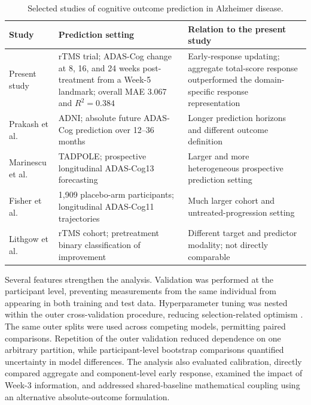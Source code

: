 \documentclass[11pt]{article}
\begin{document}
\begin{table}[H]
\centering
\caption{Selected studies of cognitive outcome prediction in Alzheimer disease.}
\label{tab:literature}
\small
\begin{tabular}{p{}p{}p{}}
\toprule
Study & Prediction setting & Relation to the present study \\
\midrule

Present study
& rTMS trial; ADAS-Cog change at 8, 16, and 24 weeks post-treatment from a Week-5 landmark; overall MAE 3.067 and $R^2=0.384$
& Early-response updating; aggregate total-score response outperformed the domain-specific response representation \\

\addlinespace

Prakash et al. \citep{prakash2021quantitative}
& ADNI; absolute future ADAS-Cog prediction over 12--36 months
& Longer prediction horizons and different outcome definition \\

\addlinespace

Marinescu et al. \citep{marinescu2021tadpole}
& TADPOLE; prospective longitudinal ADAS-Cog13 forecasting
& Larger and more heterogeneous prospective prediction setting \\

\addlinespace

Fisher et al. \citep{fisher2019forecasting}
& 1,909 placebo-arm participants; longitudinal ADAS-Cog11 trajectories
& Much larger cohort and untreated-progression setting \\

\addlinespace

Lithgow et al. \citep{lithgow2022baseline}
& rTMS cohort; pretreatment binary classification of improvement
& Different target and predictor modality; not directly comparable \\

\bottomrule
\end{tabular}
\end{table}

Several features strengthen the analysis. Validation was performed at the participant level, preventing measurements from the same individual from appearing in both training and test data. Hyperparameter tuning was nested within the outer cross-validation procedure, reducing selection-related optimism \citep{cawley2010overfitting}. The same outer splits were used across competing models, permitting paired comparisons. Repetition of the outer validation reduced dependence on one arbitrary partition, while participant-level bootstrap comparisons quantified uncertainty in model differences. The analysis also evaluated calibration, directly compared aggregate and component-level early response, examined the impact of Week-3 information, and addressed shared-baseline mathematical coupling using an alternative absolute-outcome formulation.
\end{document}
